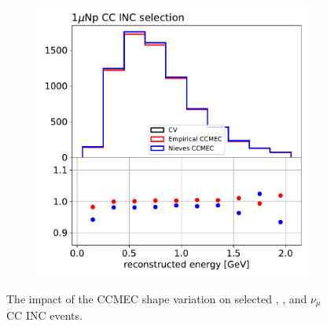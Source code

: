 \begin{figure}[H]
\begin{center}
\begin{subfigure}[b]{0.3\textwidth}
    \end{subfigure}
    \begin{subfigure}[b]{0.3\textwidth}
    \includegraphics[width=1.00\textwidth]{Systematics/systvariations/numuCCINC_CCMEC.pdf}
    \end{subfigure}
\caption{\label{fig:ccmec} The impact of the CCMEC shape variation on selected \npsel, \zpsel, and $\nu_{\mu}$ CC INC events. }
\end{center}
\end{figure}



